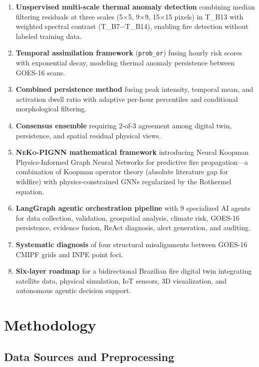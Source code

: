 \documentclass[11pt,twocolumn,a4paper]{article}
\newcommand{\code}[1]{\texttt{#1}}
\newcommand{\abbrev}[1]{{\small\textsc{#1}}}
\begin{document}
\begin{enumerate}
  \item \textbf{Unspervised multi-scale thermal anomaly detection} combining median filtering residuals at three scales (5$\times$5, 9$\times$9, 15$\times$15 pixels) in \abbrev{T\_B13} with weighted spectral contrast (\abbrev{T\_B7}$-$\abbrev{T\_B14}), enabling fire detection without labeled training data.
  \item \textbf{Temporal assimilation framework} (\code{prob\_or}) fusing hourly risk scores with exponential decay, modeling thermal anomaly persistence between \abbrev{GOES-16} scans.
  \item \textbf{Combined persistence method} fusing peak intensity, temporal mean, and activation dwell ratio with adaptive per-hour percentiles and conditional morphological filtering.
  \item \textbf{Consensus ensemble} requiring 2-of-3 agreement among digital twin, persistence, and spatial residual physical views.
  \item \textbf{\abbrev{NeKo-PIGNN} mathematical framework} introducing Neural Koopman Physics-Informed Graph Neural Networks for predictive fire propagation---a combination of Koopman operator theory (absolute literature gap for wildfire) with physics-constrained \abbrev{GNN}s regularized by the Rothermel equation.
  \item \textbf{LangGraph agentic orchestration pipeline} with 9 specialized \abbrev{AI} agents for data collection, validation, geospatial analysis, climate risk, \abbrev{GOES-16} persistence, evidence fusion, ReAct diagnosis, alert generation, and auditing.
  \item \textbf{Systematic diagnosis} of four structural misalignments between \abbrev{GOES-16} \abbrev{CMIPF} grids and \abbrev{INPE} point foci.
  \item \textbf{Six-layer roadmap} for a bidirectional Brazilian fire digital twin integrating satellite data, physical simulation, IoT sensors, 3D visualization, and autonomous agentic decision support.
\end{enumerate}

\section{Methodology}
\label{sec:method}

\subsection{Data Sources and Preprocessing}
\end{document}
